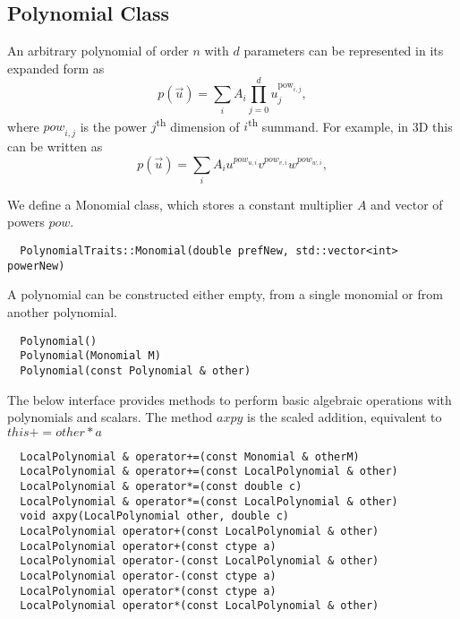 \subsection{Polynomial Class}
\label{interface-geometry-polynomial}

\noindent
An arbitrary polynomial of order $n$ with $d$ parameters can be represented in its expanded form as
\[ p(\vec{u}) = \sum_i A_i \prod_{j = 0}^d u_j^{\mathrm{pow}_{i,j}},  \]
where ${pow}_{i,j}$ is the power $j$\textsuperscript{th} dimension of $i$\textsuperscript{th} summand. For example, in 3D this can be written as
\[ p(\vec{u}) = \sum_i A_i u^{pow_{u,i}} v^{pow_{v,i}} w^{pow_{w, i}},  \]

\noindent
We define a Monomial class, which stores a constant multiplier $A$ and vector of powers $pow$.

\begin{mybox}
\begin{lstlisting}
  PolynomialTraits::Monomial(double prefNew, std::vector<int> powerNew)
\end{lstlisting}
\end{mybox}

\noindent
A polynomial can be constructed either empty, from a single monomial or from another polynomial.

\begin{mybox}
\begin{lstlisting}
  Polynomial()
  Polynomial(Monomial M)
  Polynomial(const Polynomial & other)
\end{lstlisting}
\end{mybox}

\noindent
The below interface provides methods to perform basic algebraic operations with polynomials and scalars. The method $axpy$ is the scaled addition, equivalent to $this += other * a$

\begin{mybox}
\begin{lstlisting}
  LocalPolynomial & operator+=(const Monomial & otherM)
  LocalPolynomial & operator+=(const LocalPolynomial & other)
  LocalPolynomial & operator*=(const double c)  
  LocalPolynomial & operator*=(const LocalPolynomial & other)  
  void axpy(LocalPolynomial other, double c)
  LocalPolynomial operator+(const LocalPolynomial & other)
  LocalPolynomial operator+(const ctype a)  
  LocalPolynomial operator-(const LocalPolynomial & other)  
  LocalPolynomial operator-(const ctype a)  
  LocalPolynomial operator*(const ctype a)  
  LocalPolynomial operator*(const LocalPolynomial & other)
\end{lstlisting}
\end{mybox}

